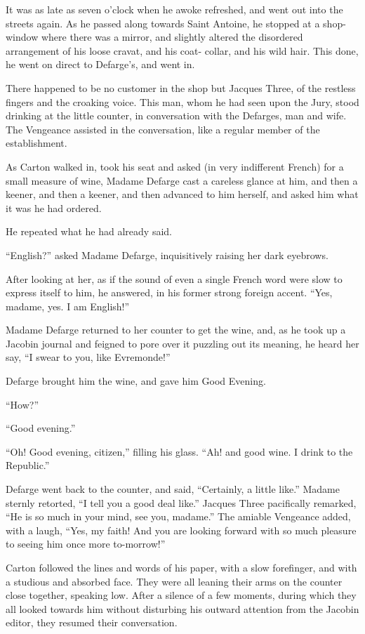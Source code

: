 It was as late as seven o'clock when he awoke refreshed, and went out
into the streets again.  As he passed along towards Saint Antoine, he
stopped at a shop-window where there was a mirror, and slightly
altered the disordered arrangement of his loose cravat, and his coat-%
collar, and his wild hair.  This done, he went on direct to Defarge's,
and went in.

There happened to be no customer in the shop but Jacques Three,
of the restless fingers and the croaking voice.  This man, whom he
had seen upon the Jury, stood drinking at the little counter, in
conversation with the Defarges, man and wife.  The Vengeance assisted
in the conversation, like a regular member of the establishment.

As Carton walked in, took his seat and asked (in very indifferent
French) for a small measure of wine, Madame Defarge cast a careless
glance at him, and then a keener, and then a keener, and then
advanced to him herself, and asked him what it was he had ordered.

He repeated what he had already said.

``English?'' asked Madame Defarge, inquisitively raising her dark eyebrows.

After looking at her, as if the sound of even a single French word
were slow to express itself to him, he answered, in his former strong
foreign accent.  ``Yes, madame, yes.  I am English!''

Madame Defarge returned to her counter to get the wine, and, as he
took up a Jacobin journal and feigned to pore over it puzzling out
its meaning, he heard her say, ``I swear to you, like Evremonde!''

Defarge brought him the wine, and gave him Good Evening.

``How?''

``Good evening.''

``Oh!  Good evening, citizen,'' filling his glass.  ``Ah! and good wine.
I drink to the Republic.''

Defarge went back to the counter, and said, ``Certainly, a little
like.''  Madame sternly retorted, ``I tell you a good deal like.''
Jacques Three pacifically remarked, ``He is so much in your mind,
see you, madame.''  The amiable Vengeance added, with a laugh, ``Yes,
my faith!  And you are looking forward with so much pleasure to seeing
him once more to-morrow!''

Carton followed the lines and words of his paper, with a slow
forefinger, and with a studious and absorbed face.  They were all
leaning their arms on the counter close together, speaking low.
After a silence of a few moments, during which they all looked
towards him without disturbing his outward attention from the Jacobin
editor, they resumed their conversation.

